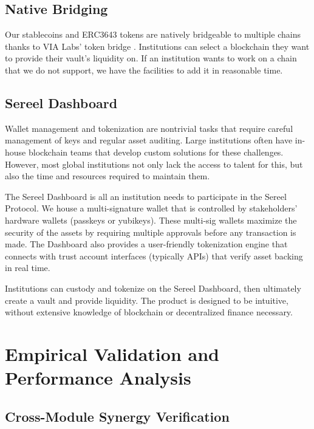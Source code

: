 \documentclass[12pt]{article}
\begin{document}
\subsection{Native Bridging}
Our stablecoins and ERC3643 tokens are natively bridgeable to multiple chains thanks to VIA Labs' token bridge \citep{vialabs2024bridge}. Institutions can select a blockchain they want to provide their vault's liquidity on. If an institution wants to work on a chain that we do not support, we have the facilities to add it in reasonable time.

\subsection{Sereel Dashboard}
Wallet management and tokenization are nontrivial tasks that require careful management of keys and regular asset auditing. Large institutions often have in-house blockchain teams that develop custom solutions for these challenges. However, most global institutions not only lack the access to talent for this, but also the time and resources required to maintain them. 

The Sereel Dashboard is all an institution needs to participate in the Sereel Protocol. We house a multi-signature wallet that is controlled by stakeholders' hardware wallets (passkeys or yubikeys). These multi-sig wallets maximize the security of the assets by requiring multiple approvals before any  transaction is made. The Dashboard also provides a user-friendly tokenization engine that connects with trust account interfaces (typically APIs) that verify asset backing in real time.

Institutions can custody and tokenize on the Sereel Dashboard, then ultimately create a vault and provide liquidity. The product is designed to be intuitive, without extensive knowledge of blockchain or decentralized finance necessary.

\section{Empirical Validation and Performance Analysis}

\subsection{Cross-Module Synergy Verification}
\end{document}
